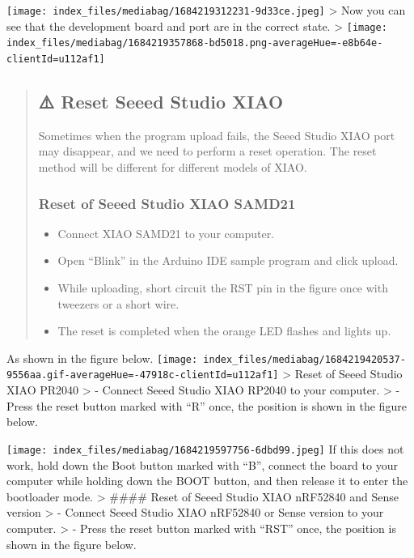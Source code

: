 \documentclass[
  letterpaper,
  DIV=11,
  numbers=noendperiod]{scrreprt}
\providecommand{\tightlist}{%
  \setlength{\itemsep}{0pt}\setlength{\parskip}{0pt}}\usepackage{longtable,booktabs,array}
\begin{document}
\texttt{[image: index\_files/mediabag/1684219312231-9d33ce.jpeg]}
\textgreater{} Now you can see that the development board and port are
in the correct state. \textgreater{}
\texttt{[image: index\_files/mediabag/1684219357868-bd5018.png-averageHue=-e8b64e-clientId=u112af1]}

\begin{quote}
\hypertarget{reset-seeed-studio-xiao}{%
\subsection*{⚠️ Reset Seeed Studio XIAO}\label{reset-seeed-studio-xiao}}

Sometimes when the program upload fails, the Seeed Studio XIAO port may
disappear, and we need to perform a reset operation. The reset method
will be different for different models of XIAO.

\hypertarget{reset-of-seeed-studio-xiao-samd21}{%
\subsubsection*{Reset of Seeed Studio XIAO
SAMD21}\label{reset-of-seeed-studio-xiao-samd21}}

\begin{itemize}
\tightlist
\item
  Connect XIAO SAMD21 to your computer.
\item
  Open ``Blink'' in the Arduino IDE sample program and click upload.
\item
  While uploading, short circuit the RST pin in the figure once with
  tweezers or a short wire.
\item
  The reset is completed when the orange LED flashes and lights up.
\end{itemize}
\end{quote}

As shown in the figure below.
\texttt{[image: index\_files/mediabag/1684219420537-9556aa.gif-averageHue=-47918c-clientId=u112af1]}
\textgreater{} Reset of Seeed Studio XIAO PR2040 \textgreater{} -
Connect Seeed Studio XIAO RP2040 to your computer. \textgreater{} -
Press the reset button marked with ``R'' once, the position is shown in
the figure below.

\texttt{[image: index\_files/mediabag/1684219597756-6dbd99.jpeg]} If this
does not work, hold down the Boot button marked with ``B'', connect the
board to your computer while holding down the BOOT button, and then
release it to enter the bootloader mode. \textgreater{} \#\#\#\# Reset
of Seeed Studio XIAO nRF52840 and Sense version \textgreater{} - Connect
Seeed Studio XIAO nRF52840 or Sense version to your computer.
\textgreater{} - Press the reset button marked with ``RST'' once, the
position is shown in the figure below.
\end{document}
